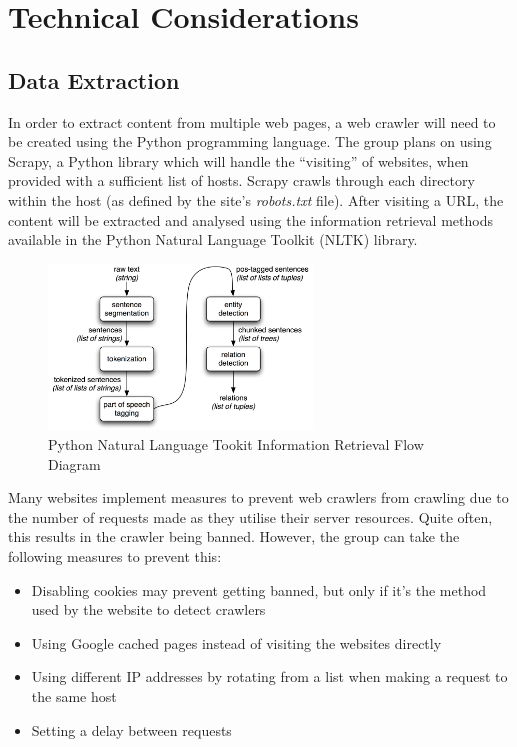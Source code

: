 \section{Technical Considerations}

\subsection{Data Extraction}

In order to extract content from multiple web pages, a web crawler will need to be created using the Python programming language. The group plans on using Scrapy, a Python library which will handle the ``visiting'' of websites, when provided with a sufficient list of hosts. Scrapy crawls through each directory within the host (as defined by the site's \textsl{robots.txt} file). After visiting a URL, the content will be extracted and analysed using the information retrieval methods available in the Python Natural Language Toolkit (NLTK) library.

\begin{figure}
  \centering
  \begin{minipage}{7cm}
    \centering
    \includegraphics[width=7cm]{inc/ie-architecture.jpg}
    \caption{Python Natural Language Tookit Information Retrieval Flow Diagram}
    \label{fig:information_retrieval}
  \end{minipage}
\end{figure}

Many websites implement measures to prevent web crawlers from crawling due to the number of requests made as they utilise their server resources. Quite often, this results in the crawler being banned. However, the group can take the following measures to prevent this:

\begin{itemize}
  \item Disabling cookies may prevent getting banned, but only if it’s the method used by the website to detect crawlers
  \item Using Google cached pages instead of visiting the websites directly
  \item Using different IP addresses by rotating from a list when making a request to the same host
  \item Setting a delay between requests
\end{itemize}


